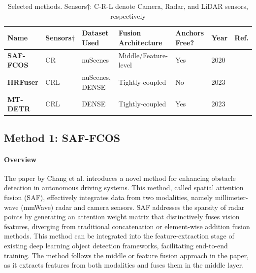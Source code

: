 \documentclass[report.tex]{subfiles}
\begin{document}
        \begin{table}[h]
            \centering
            \caption{Selected methods. Sensors†: C-R-L denote Camera, Radar, and LiDAR sensors, respectively}
            \begin{tabular}{|l|l|l|l|l|l|l|}
            \hline
            \textbf{Name} & \textbf{Sensors†} & \textbf{Dataset Used} & \textbf{Fusion Architecture} & \textbf{Anchors Free?} & \textbf{Year} & \textbf{Ref.}\\ \hline
            \textbf{SAF-FCOS} & CR & nuScenes & Middle/Feature-level & Yes & 2020 & \cite{chang2020spatial} \\ \hline
            \textbf{HRFuser} & CRL & nuScenes, DENSE & Tightly-coupled & No & 2023 & \cite{broedermann2022hrfuser} \\ \hline
            \textbf{MT-DETR} & CRL & DENSE & Tightly-coupled & Yes & 2023 & \cite{chu2023mt} \\ \hline
            \end{tabular}
            \label{tab:selected_methods}
        \end{table}

    

    \subsection{Method 1: SAF-FCOS}
    \label{sec:method_1}

    \paragraph*{Overview}
    
    The paper by Chang et al. \cite{chang2020spatial} introduces a novel method for enhancing obstacle detection in autonomous driving systems. This method, called spatial attention fusion (SAF), effectively integrates data from two modalities, namely millimeter-wave (mmWave) radar and camera sensors. SAF addresses the sparsity of radar points by generating an attention weight matrix that distinctively fuses vision features, diverging from traditional concatenation or element-wise addition fusion methods. This method can be integrated into the feature-extraction stage of existing deep learning object detection frameworks, facilitating end-to-end training. The method follows the middle or feature fusion approach in the paper, as it extracts features from both modalities and fuses them in the middle layer. 
\end{document}
